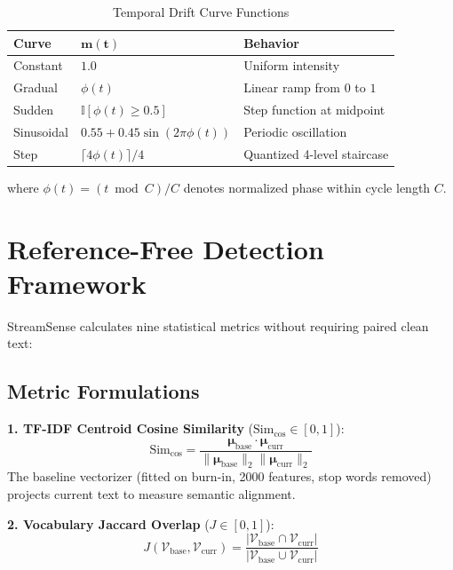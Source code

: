 \documentclass[conference]{IEEEtran}
\begin{document}
\begin{table}[htbp]
\caption{Temporal Drift Curve Functions}
\label{tab:curves}
\centering
\begin{tabular}{lll}
\toprule
\textbf{Curve} & $\mathbf{m(t)}$ & \textbf{Behavior} \\
\midrule
Constant & $1.0$ & Uniform intensity \\
Gradual & $\phi(t)$ & Linear ramp from $0$ to $1$ \\
Sudden & $\mathbb{I}[\phi(t) \ge 0.5]$ & Step function at midpoint \\
Sinusoidal & $0.55 + 0.45\sin(2\pi\phi(t))$ & Periodic oscillation \\
Step & $\lceil 4\phi(t)\rceil / 4$ & Quantized 4-level staircase \\
\bottomrule
\end{tabular}
\end{table}
\noindent where $\phi(t) = (t \bmod C) / C$ denotes normalized phase within cycle length $C$.

\section{Reference-Free Detection Framework}

StreamSense calculates nine statistical metrics without requiring paired clean text:

\subsection{Metric Formulations}
\textbf{1. TF-IDF Centroid Cosine Similarity} ($\text{Sim}_{\text{cos}} \in [0, 1]$):
\begin{equation}
\text{Sim}_{\text{cos}} = \frac{\boldsymbol{\mu}_{\text{base}} \cdot \boldsymbol{\mu}_{\text{curr}}}{\|\boldsymbol{\mu}_{\text{base}}\|_2 \|\boldsymbol{\mu}_{\text{curr}}\|_2}
\end{equation}
The baseline vectorizer (fitted on burn-in, 2000 features, stop words removed) projects current text to measure semantic alignment.

\textbf{2. Vocabulary Jaccard Overlap} ($J \in [0, 1]$):
\begin{equation}
J(\mathcal{V}_{\text{base}}, \mathcal{V}_{\text{curr}}) = \frac{|\mathcal{V}_{\text{base}} \cap \mathcal{V}_{\text{curr}}|}{|\mathcal{V}_{\text{base}} \cup \mathcal{V}_{\text{curr}}|}
\end{equation}
\end{document}
